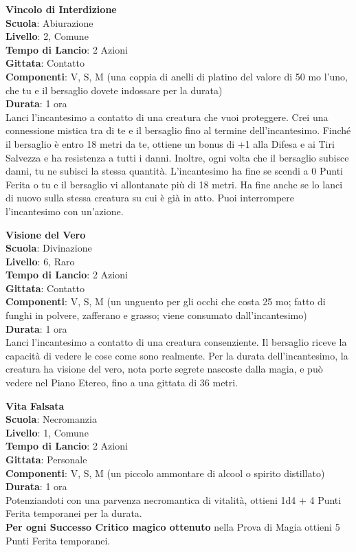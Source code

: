 \begin{multicols}{2}
\medskip\textbf{Vincolo di Interdizione}\\
\textbf{Scuola}: Abiurazione\\
\textbf{Livello}: 2, Comune\\
\textbf{Tempo di Lancio}: 2 Azioni\\
\textbf{Gittata}: Contatto\\
\textbf{Componenti}: V, S, M (una coppia di anelli di platino del valore di 50 mo l'uno, che tu e il bersaglio dovete indossare per la durata)\\
\textbf{Durata}: 1 ora\\
Lanci l'incantesimo a contatto di una creatura che vuoi proteggere. Crei una connessione mistica tra di te e il bersaglio fino al termine dell'incantesimo. Finché il bersaglio è entro 18 metri da te, ottiene un bonus di +1 alla Difesa e ai Tiri Salvezza e ha resistenza a tutti i danni. Inoltre, ogni volta che il bersaglio subisce danni, tu ne subisci la stessa quantità. L'incantesimo ha fine se scendi a 0 Punti Ferita o tu e il bersaglio vi allontanate più di 18 metri. Ha fine anche se lo lanci di nuovo sulla stessa creatura su cui è già in atto. Puoi interrompere l'incantesimo con un'azione.

\medskip\textbf{Visione del Vero}\\
\textbf{Scuola}: Divinazione\\
\textbf{Livello}: 6, Raro\\
\textbf{Tempo di Lancio}: 2 Azioni\\
\textbf{Gittata}: Contatto\\
\textbf{Componenti}: V, S, M (un unguento per gli occhi che costa 25 mo; fatto di funghi in polvere, zafferano e grasso; viene consumato dall'incantesimo)\\
\textbf{Durata}: 1 ora\\
Lanci l'incantesimo a contatto di una creatura consenziente. Il bersaglio riceve la capacità di vedere le cose come sono realmente. Per la durata dell'incantesimo, la creatura ha visione del vero, nota porte segrete nascoste dalla magia, e può vedere nel Piano Etereo, fino a una gittata di 36 metri.

\medskip\textbf{Vita Falsata}\\
\textbf{Scuola}: Necromanzia\\
\textbf{Livello}: 1, Comune\\
\textbf{Tempo di Lancio}: 2 Azioni\\
\textbf{Gittata}: Personale\\
\textbf{Componenti}: V, S, M (un piccolo ammontare di alcool o spirito distillato)\\
\textbf{Durata}: 1 ora\\
Potenziandoti con una parvenza necromantica di vitalità, ottieni 1d4 + 4 Punti Ferita temporanei per la durata.\\
\textbf{Per ogni Successo Critico magico ottenuto} nella Prova di Magia ottieni 5 Punti Ferita temporanei.


\end{multicols}
